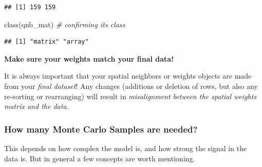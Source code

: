 \documentclass[
]{book}
\newenvironment{Shaded}{\begin{snugshade}}{\end{snugshade}}
\newcommand{\CommentTok}[1]{\textcolor[rgb]{0.56,0.35,0.01}{\textit{#1}}}
\newcommand{\FunctionTok}[1]{\textcolor[rgb]{0.00,0.00,0.00}{#1}}
\newcommand{\NormalTok}[1]{#1}
\newenvironment{rmdcaution}[1]
  {
  \begin{itemize}
  \renewcommand{\labelitemi}{
    \raisebox{-.7\height}[0pt][0pt]{
      {\setkeys{Gin}{width=3em,keepaspectratio}\texttt{[image: images/\#1]}}
    }
  }
  \setlength{\fboxsep}{1em}
  \begin{caution}
  \item
  }
  {
  \end{caution}
  \end{itemize}
  }
\begin{document}
\begin{verbatim}
## [1] 159 159
\end{verbatim}

\begin{Shaded}
\begin{Highlighting}[]
\FunctionTok{class}\NormalTok{(qnb\_mat) }\CommentTok{\# confirming its class}
\end{Highlighting}
\end{Shaded}

\begin{verbatim}
## [1] "matrix" "array"
\end{verbatim}

\begin{rmdcaution}{caution}
\textbf{Make sure your weights match your final data!}

It is always important that your spatial neighbors or weights objects are made from your \emph{final dataset}! Any changes (additions or deletion of rows, but also any re-sorting or rearranging) will result in \emph{misalignment between the spatial weights matrix and the data}.

\end{rmdcaution}

\hypertarget{how-many-monte-carlo-samples-are-needed}{%
\subsubsection{How many Monte Carlo Samples are needed?}\label{how-many-monte-carlo-samples-are-needed}}

This depends on how complex the model is, and how strong the signal in the data is. But in general a few concepts are worth mentioning.
\end{document}
